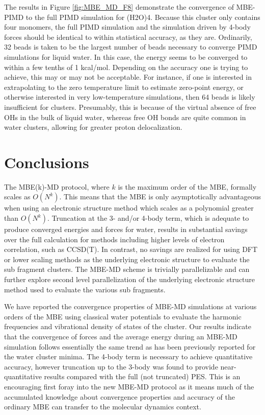 \documentclass[11pt, proquest]{uwthesis}[2020/02/24]
\let\ce\ch
\begin{document}
\par The results in Figure \ref{fig:MBE_MD_F8} demonstrate the convergence of MBE-PIMD to the full PIMD simulation for (H2O)4. Because this cluster only contains four monomers, the full PIMD simulation and the simulation driven by 4-body forces should be identical to within statistical accuracy, as they are. Ordinarily, 32 beads is taken to be the largest number of beads necessary to converge PIMD simulations for liquid water.\autocite{ceriotti_i-pi_2014} In this case, the energy seems to be converged to within a few tenths of 1 kcal/mol. Depending on the accuracy one is trying to achieve, this may or may not be acceptable. For instance, if one is interested in extrapolating to the zero temperature limit to estimate zero-point energy, or otherwise interested in very low-temperature simulations,\autocite{uhl_accelerated_2016,schran_quantum_2019} then 64 beads is likely insufficient for clusters. Presumably, this is because of the virtual absence of free OHs in the bulk of liquid water, whereas free OH bonds are quite common in water clusters, allowing for greater proton delocalization.

\section{Conclusions}

\par The MBE(k)-MD protocol, where $k$ is the maximum order of the MBE, formally scales as $O(N^k)$. This means that the MBE is only asymptotically advantageous when using an electronic structure method which scales as a polynomial greater than $O(N^k)$. Truncation at the 3- and/or 4-body term, which is adequate to produce converged energies and forces for water, results in substantial savings over the full calculation for methods including higher levels of electron correlation, such as CCSD(T). In contrast, no savings are realized for using DFT or lower scaling methods as the underlying electronic structure to evaluate the sub fragment clusters. The MBE-MD scheme is trivially parallelizable and can further explore second level parallelization of the underlying electronic structure method used to evaluate the various sub fragments.

\par We have reported the convergence properties of MBE-MD simulations at various orders of the MBE using classical water potentials to evaluate the harmonic frequencies and vibrational density of states of the \ce{(H2O)_{10}} cluster. Our results indicate that the convergence of forces and the average energy during an MBE-MD simulation follows essentially the same trend as has been previously reported for the water cluster minima. The 4-body term is necessary to achieve quantitative accuracy, however truncation up to the 3-body was found to provide near-quantitative results compared with the full (not truncated) PES. This is an encouraging first foray into the new MBE-MD protocol as it means much of the accumulated knowledge about convergence properties and accuracy of the ordinary MBE can transfer to the molecular dynamics context.
\end{document}
